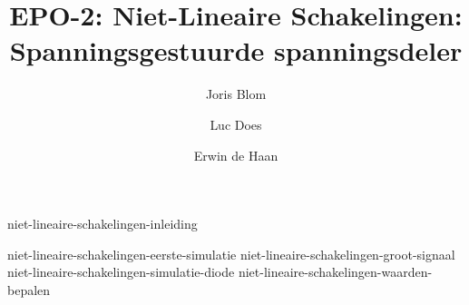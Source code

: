 \documentclass{report}
\title{EPO-2: Niet-Lineaire Schakelingen: Spanningsgestuurde spanningsdeler}
\author{Joris Blom \and Luc Does \and Erwin de Haan}
\begin{document}
\maketitle
\newpage
{}

{niet-lineaire-schakelingen-inleiding}
\tableofcontents

\newpage
{}

{niet-lineaire-schakelingen-eerste-simulatie}
{niet-lineaire-schakelingen-groot-signaal}
{niet-lineaire-schakelingen-simulatie-diode}
{niet-lineaire-schakelingen-waarden-bepalen}


\printbibliography
\end{document}
